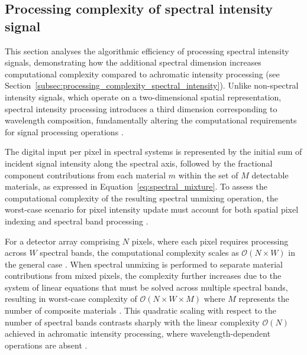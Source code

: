 \documentclass[12pt,a4paper,oneside]{report}
\begin{document}
\subsection{Processing complexity of spectral intensity signal}
\label{subsubsec:processing_complexity_spectral_temporal_pre}

This section analyses the algorithmic efficiency of processing spectral intensity signals, demonstrating how the additional spectral dimension increases computational complexity compared to achromatic intensity processing (see Section~\ref{subsec:processing_complexity_spectral_intensity}). Unlike non-spectral intensity signals, which operate on a two-dimensional spatial representation, spectral intensity processing introduces a third dimension corresponding to wavelength composition, fundamentally altering the computational requirements for signal processing operations \cite{heinz2001,schott2007}.

The digital input per pixel in spectral systems is represented by the initial sum of incident signal intensity along the spectral axis, followed by the fractional component contributions from each material $m$ within the set of $M$ detectable materials, as expressed in Equation~\ref{eq:spectral_mixture}. To assess the computational complexity of the resulting spectral unmixing operation, the worst-case scenario for pixel intensity update must account for both spatial pixel indexing and spectral band processing \cite{heinz2001,vasile2023}. 

For a detector array comprising $N$ pixels, where each pixel requires processing across $W$ spectral bands, the computational complexity scales as $\mathcal{O}(N \times W)$ in the general case \cite{knuth1976}. When spectral unmixing is performed to separate material contributions from mixed pixels, the complexity further increases due to the system of linear equations that must be solved across multiple spectral bands, resulting in worst-case complexity of $\mathcal{O}(N \times W \times M)$ where $M$ represents the number of composite materials \cite{heinz2001,vasile2023}. This quadratic scaling with respect to the number of spectral bands contrasts sharply with the linear complexity $\mathcal{O}(N)$ achieved in achromatic intensity processing, where wavelength-dependent operations are absent \cite{knuth1976}.
\end{document}
